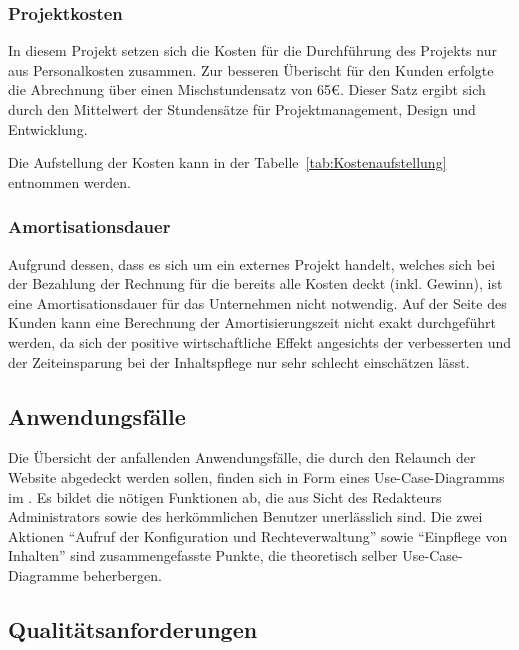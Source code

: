 \subsubsection{Projektkosten}
\label{sec:Projektkosten}

In diesem Projekt setzen sich die Kosten für die Durchführung des Projekts
nur aus Personalkosten zusammen. Zur besseren Überischt für den Kunden erfolgte
die Abrechnung über einen Mischstundensatz von 65€. Dieser Satz ergibt sich
durch den Mittelwert der Stundensätze für Projektmanagement, Design und Entwicklung.

Die Aufstellung der Kosten kann in der Tabelle~\ref{tab:Kostenaufstellung}
entnommen werden.



\subsubsection{Amortisationsdauer}
\label{sec:Amortisationsdauer}

Aufgrund dessen, dass es sich um ein externes Projekt handelt, welches sich bei
der Bezahlung der Rechnung für die \mh bereits alle Kosten deckt (inkl. Gewinn), ist
eine Amortisationsdauer für das Unternehmen nicht notwendig.
Auf der Seite des Kunden kann eine Berechnung der Amortisierungszeit nicht exakt
durchgeführt werden, da sich der positive wirtschaftliche Effekt angesichts der
verbesserten  und der Zeiteinsparung bei der
Inhaltspflege nur sehr schlecht einschätzen lässt.


\subsection{Anwendungsfälle}
\label{sec:Anwendungsfaelle}

Die Übersicht der anfallenden Anwendungsfälle, die durch den Relaunch der
Website abgedeckt werden sollen, finden sich in Form eines Use-Case-Diagramms
im . Es bildet die nötigen Funktionen ab, die aus Sicht
des Redakteurs \bzw Administrators sowie des herkömmlichen Benutzer unerlässlich
sind. Die zwei Aktionen "`Aufruf der Konfiguration und Rechteverwaltung"' sowie
"`Einpflege von Inhalten"' sind zusammengefasste Punkte, die theoretisch selber
Use-Case-Diagramme beherbergen.

\subsection{Qualitätsanforderungen}
\label{sec:Qualitaetsanforderungen}

